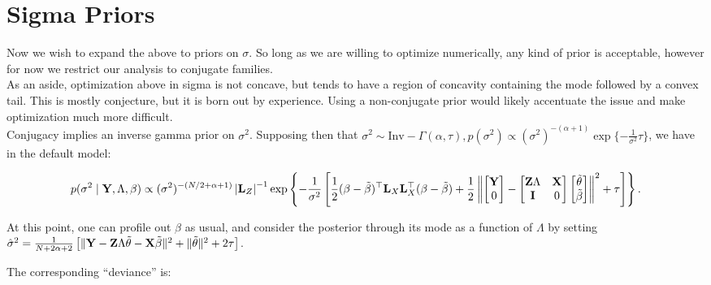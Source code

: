 \documentclass[10pt]{article}
\begin{document}
\newpage

\section*{Sigma Priors}

Now we wish to expand the above to priors on $\sigma$. So long as we
are willing to optimize numerically, any kind of prior is acceptable,
however for now we restrict our analysis to conjugate families. \\

As an aside, optimization above in sigma is not concave, but tends to have a region of concavity
containing the mode followed by a convex tail. This is mostly
conjecture, but it is born out by experience. Using a non-conjugate
prior would likely accentuate the issue and make optimization much
more difficult. \\

Conjugacy implies an inverse gamma prior on $\sigma^2$. Supposing then
that $\sigma^2 \sim \mathrm{Inv}-\Gamma(\alpha, \tau),
p(\sigma^2)\propto (\sigma^2)^{-(\alpha +
  1)}\exp\{-\frac{1}{\sigma^2}\tau\}$, we have in the default model:

\begin{equation*}
p(\sigma^2 \mid {\bf Y}, \Lambda, \beta) \propto
(\sigma^2)^{-(N/2 + \alpha + 1)}\left|{\bf L}_Z\right|^{-1}
\exp\left\{-\frac{1}{\sigma^2}\left[
\frac{1}{2}(\beta - \tilde\beta)^\top{\bf L}_X{\bf L}_X^\top(\beta -
\tilde\beta) + \frac{1}{2}
\left\|\begin{bmatrix} {\bf Y} \\ 0 \end{bmatrix} -
\begin{bmatrix} {\bf Z}\Lambda & {\bf X} \\ {\bf I} & 0 \end{bmatrix}
\begin{bmatrix}\tilde\theta \\ \tilde\beta \end{bmatrix} \right\|^2 +
\tau
\right]\right\}.
\end{equation*}

At this point, one can profile out $\beta$ as usual, and consider the posterior
through its mode as a function of $\Lambda$ by setting $\hat{\sigma}^2
= \frac{1}{N+ 2\alpha + 2}\left[\|{\bf Y} - {\bf Z}\Lambda\tilde\theta
  - {\bf X}\tilde\beta\|^2 + \|\tilde\theta\|^2 + 2\tau\right]$.

The corresponding ``deviance'' is:
\end{document}
